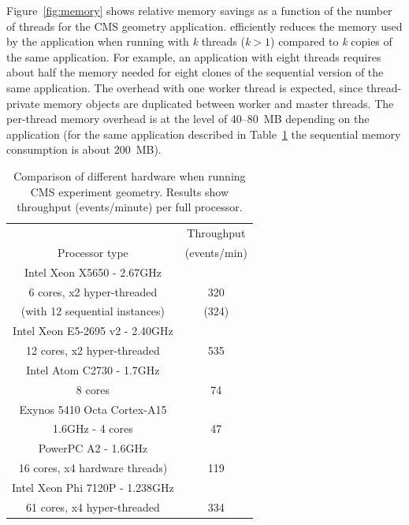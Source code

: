 Figure~\ref{fig:memory} shows relative memory savings as a function of the
number of threads for the CMS geometry application.  \Gfour{} efficiently reduces
the memory used by the application when running with {\it k} threads 
({\it k}$>1$) compared to {\it k} copies of the same application.  For example, 
an application with eight threads requires about half the memory needed for 
eight clones of the sequential version of the same application.  The overhead 
with one worker thread is expected, since thread-private memory objects are
duplicated between worker and master threads.  The per-thread memory overhead
is at the level of 40--80~MB depending on the application (for the same 
application described in Table~\ref{tab:MT:perf} the sequential memory 
consumption is about 200~MB).
 
\begin{table}[htdp]
\begin{center}
\begin{tabular}{|c|c|}
\hline
 & Throughput \\ Processor type & (events/min) \\
\hline
\hline
Intel Xeon X5650 - 2.67GHz & \\ 6 cores, x2 hyper-threaded & 320 \\
                                                 (with 12 sequential instances) & (324) \\\hline 
Intel Xeon E5-2695 v2 - 2.40GHz & \\12 cores, x2 hyper-threaded & 535 \\\hline
Intel Atom C2730 - 1.7GHz & \\ 8 cores & 74 \\ \hline
Exynos 5410 Octa Cortex-A15 & \\1.6GHz - 4 cores & 47 \\\hline
PowerPC A2 - 1.6GHz & \\ 16 cores, x4 hardware threads) & 119 \\\hline
Intel Xeon Phi 7120P - 1.238GHz & \\ 61 cores, x4 hyper-threaded & 334\\\hline
\end{tabular}
\end{center}
\caption{Comparison of different hardware when running CMS experiment geometry.
         Results show throughput (events/minute) per full processor.}
\label{tab:MT:perf}
\end{table}

